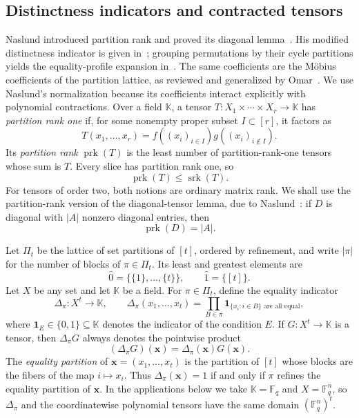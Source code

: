 \documentclass[10pt,a4paper]{amsart}
\theoremstyle{definition}
\newcommand{\F}{\mathbb F}
\newcommand{\srk}{\operatorname{srk}}
\newcommand{\prk}{\operatorname{prk}}
\newcommand{\1}{\mathbf 1}
\begin{document}
\subsection{Distinctness indicators and contracted tensors}
{ Naslund introduced partition rank and proved its diagonal lemma~\cite[Lemma~11]{NaslundPartition}.  His modified distinctness indicator is given in~\cite[Lemmas~14--15]{NaslundPartition}; grouping permutations by their cycle partitions yields the equality-profile expansion in~\cite[Eq.~(3.2)]{NaslundPartition}.}  The same coefficients are the M\"obius coefficients of the partition lattice, as reviewed and generalized by Omar~\cite[Section~2.1 and Theorem~8]{OmarPartition}.  We use Naslund's normalization because its coefficients interact explicitly with polynomial contractions.  Over a field $\mathbb K$, a tensor $T:X_1\times\cdots\times X_r\to\mathbb K$ has \emph{partition rank one} if, for some nonempty proper subset $I\subset[r]$, it factors as
\[
 T(x_1,\ldots,x_r)=
 f((x_i)_{i\in I})g((x_i)_{i\notin I}).
\]
Its \emph{partition rank} $\prk(T)$ is the least number of partition-rank-one tensors whose sum is $T$.  Every slice has partition rank one, so
\[
 \prk(T)\le\srk(T).
\]
For tensors of order two, both notions are ordinary matrix rank.  We shall use the partition-rank version of the diagonal-tensor lemma, due to Naslund~\cite[Lemma~11]{NaslundPartition}: if $D$ is diagonal with $|A|$ nonzero diagonal entries, then
\[
 \prk(D)=|A|.
\]

Let $\Pi_t$ be the lattice of set partitions of $[t]$, ordered by refinement, and write $|\pi|$ for the number of blocks of $\pi\in\Pi_t$.  Its least and greatest elements are
\[
 \widehat0=\bigl\{\{1\},\ldots,\{t\}\bigr\},
 \qquad
 \widehat1=\bigl\{[t]\bigr\}.
\]
Let $X$ be any set and let $\mathbb K$ be a field.  For $\pi\in\Pi_t$, define the equality indicator
\[
 \Delta_\pi:X^t\longrightarrow\mathbb K,
 \qquad
 \Delta_\pi(x_1,\ldots,x_t)=
 \prod_{B\in\pi}\1_{\{x_i:i\in B\}\text{ are all equal}},
\]
where $\1_E\in\{0,1\}\subseteq\mathbb K$ denotes the indicator of the condition $E$.  If $G:X^t\to\mathbb K$ is a tensor, then $\Delta_\pi G$ always denotes the pointwise product
\[
 (\Delta_\pi G)(\mathbf x)=\Delta_\pi(\mathbf x)G(\mathbf x).
\]
The \emph{equality partition} of $\mathbf x=(x_1,\ldots,x_t)$ is the partition of $[t]$ whose blocks are the fibers of the map $i\mapsto x_i$.  Thus $\Delta_\pi(\mathbf x)=1$ if and only if $\pi$ refines the equality partition of $\mathbf x$.  In the applications below we take $\mathbb K=\F_q$ and $X=\F_q^n$, so $\Delta_\pi$ and the coordinatewise polynomial tensors have the same domain $(\F_q^n)^t$.
\end{document}
